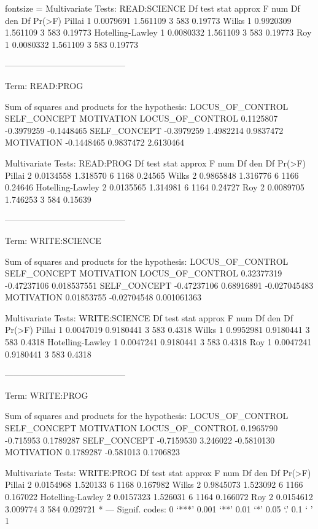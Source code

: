 \documentclass{article}
\begin{document}
\begin{enumerate}[leftmargin = 0 em, label = \arabic*., font = \bfseries]
\begin{enumerate}
\begin{rcode*}{fontsize = \footnotesize}
Multivariate Tests: READ:SCIENCE
                 Df test stat approx F num Df den Df  Pr(>F)
Pillai            1 0.0079691 1.561109      3    583 0.19773
Wilks             1 0.9920309 1.561109      3    583 0.19773
Hotelling-Lawley  1 0.0080332 1.561109      3    583 0.19773
Roy               1 0.0080332 1.561109      3    583 0.19773

------------------------------------------
 
Term: READ:PROG 

Sum of squares and products for the hypothesis:
                 LOCUS_OF_CONTROL SELF_CONCEPT MOTIVATION
LOCUS_OF_CONTROL        0.1125807   -0.3979259 -0.1448465
SELF_CONCEPT           -0.3979259    1.4982214  0.9837472
MOTIVATION             -0.1448465    0.9837472  2.6130464

Multivariate Tests: READ:PROG
                 Df test stat approx F num Df den Df  Pr(>F)
Pillai            2 0.0134558 1.318570      6   1168 0.24565
Wilks             2 0.9865848 1.316776      6   1166 0.24646
Hotelling-Lawley  2 0.0135565 1.314981      6   1164 0.24727
Roy               2 0.0089705 1.746253      3    584 0.15639

------------------------------------------
 
Term: WRITE:SCIENCE 

Sum of squares and products for the hypothesis:
                 LOCUS_OF_CONTROL SELF_CONCEPT   MOTIVATION
LOCUS_OF_CONTROL       0.32377319  -0.47237106  0.018537551
SELF_CONCEPT          -0.47237106   0.68916891 -0.027045483
MOTIVATION             0.01853755  -0.02704548  0.001061363

Multivariate Tests: WRITE:SCIENCE
                 Df test stat  approx F num Df den Df Pr(>F)
Pillai            1 0.0047019 0.9180441      3    583 0.4318
Wilks             1 0.9952981 0.9180441      3    583 0.4318
Hotelling-Lawley  1 0.0047241 0.9180441      3    583 0.4318
Roy               1 0.0047241 0.9180441      3    583 0.4318

------------------------------------------
 
Term: WRITE:PROG 

Sum of squares and products for the hypothesis:
                 LOCUS_OF_CONTROL SELF_CONCEPT MOTIVATION
LOCUS_OF_CONTROL        0.1965790    -0.715953  0.1789287
SELF_CONCEPT           -0.7159530     3.246022 -0.5810130
MOTIVATION              0.1789287    -0.581013  0.1706823

Multivariate Tests: WRITE:PROG
                 Df test stat approx F num Df den Df   Pr(>F)  
Pillai            2 0.0154968 1.520133      6   1168 0.167982  
Wilks             2 0.9845073 1.523092      6   1166 0.167022  
Hotelling-Lawley  2 0.0157323 1.526031      6   1164 0.166072  
Roy               2 0.0154612 3.009774      3    584 0.029721 *
---
Signif. codes:  0 ‘***’ 0.001 ‘**’ 0.01 ‘*’ 0.05 ‘.’ 0.1 ‘ ’ 1


\end{rcode*}
\end{enumerate}
\end{enumerate}
\end{document}
